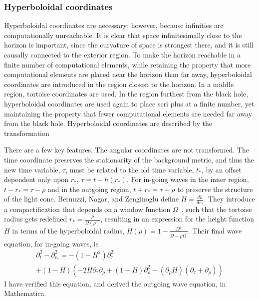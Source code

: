 \subsubsection{Hyperboloidal coordinates}  
Hyperboloidal coordinates are necessary; however, because infinities are computationally unreachable. It is clear that space infinitesimally close to the horizon is important, since the curvature of space is strongest there, and it is still causally connected to the exterior region. To make the horizon reachable in a finite number of computational elements, while retaining the property that more computational elements are placed near the horizon than far away, hyperboloidal coordinates are introduced in the region closest to the horizon. In a middle region, tortoise coordinates are used. In the region furthest from the black hole, hyperboloidal coordinates are used again to place scri plus at a finite number, yet maintaining the property that fewer computational elements are needed far away from the black hole. Hyperboloidal coordinates are described by the transformation~\cite{hyperboloidalCoordinates}

There are a few key features. The angular coordinates are not transformed. The time coordinate preserves the stationarity of the background metric, and thus the new time variable, $\tau$, must be related to the old time variable, $t_*$, by an offset dependent only upon $r_*$, $\tau=t-h(r_*)$. For in-going waves in the inner region, $t-r_*=\tau-\rho$ and in the outgoing region, $t+r_*=\tau+\rho$ to preserve the structure of the light cone. Bernuzzi, Nagar, and Zenginoglu define $H=\frac{dh}{dr_*}$. They introduce a compactification that depends on a window function $\Omega$~\cite{OmegaTransferFunction}, such that the tortoise radius gets redefined  $r_*=\frac{\rho}{\Omega(\rho)}$, resulting in an expression for the height function $H$ in terms of the hyperboloidal radius,  $H(\rho)=1-\frac{\Omega^2}{\Omega-\rho\Omega^\prime}$. Their final wave equation, for in-going waves, is~\cite{hyperboloidalCoordinates}
  \begin{eqnarray}
    \partial_t^2-\partial_{r_*}^2=-(1-H^2)\partial_\tau^2\nonumber\\
    +(1-H)(-2H\partial_\tau\partial_\rho+(1-H)\partial_\rho^2-(\partial_\rho H)(\partial_\tau+\partial_\rho))
  \end{eqnarray}    
I have verified this equation, and derived the outgoing wave equation, in Mathematica.

  



